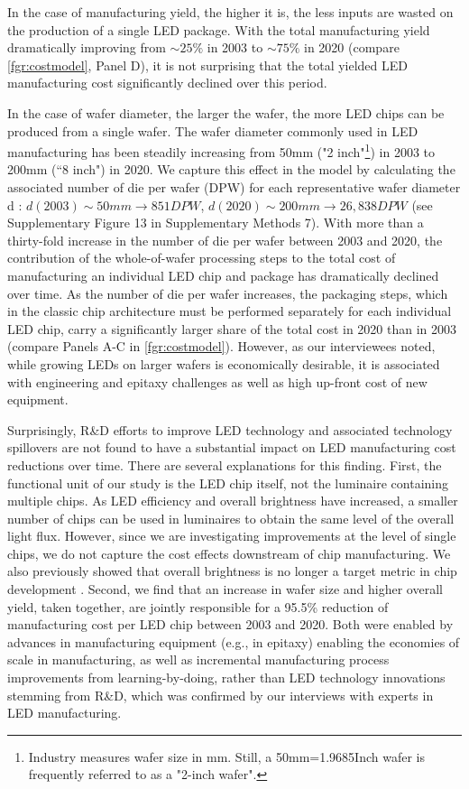 \documentclass[parskip=full]{article}
\begin{document}
In the case of manufacturing yield, the higher it is, the less inputs are wasted on the production of a single LED package. With the total manufacturing yield dramatically improving from $\sim25\%$ in 2003 to $\sim75\%$ in 2020 (compare \cref{fgr:costmodel}, Panel D), it is not surprising that the total yielded LED manufacturing cost significantly declined over this period.

In the case of wafer diameter, the larger the wafer, the more LED chips can be produced from a single wafer. The wafer diameter commonly used in LED manufacturing has been steadily increasing from 50mm ("2 inch"\footnote{Industry measures wafer size in mm. Still, a 50mm=1.9685Inch wafer is frequently referred to as a "2-inch wafer".}) in 2003 to 200mm (“8 inch") in 2020. We capture this effect in the model by calculating the associated number of die per wafer (DPW) for each representative wafer diameter d \cite{de2005investigation}: $d(2003)\sim 50 mm \rightarrow851 DPW$, $d(2020)\sim200 mm \rightarrow 26,838 DPW$ (see Supplementary Figure 13 in Supplementary Methods 7). With more than a thirty-fold increase in the number of die per wafer between 2003 and 2020, the contribution of the whole-of-wafer processing steps to the total cost of manufacturing an individual LED chip and package has dramatically declined over time. As the number of die per wafer increases, the packaging steps, which in the classic chip architecture must be performed separately for each individual LED chip, carry a significantly larger share of the total cost in 2020 than in 2003 (compare Panels A-C in \cref{fgr:costmodel}). However, as our interviewees noted, while growing LEDs on larger wafers is economically desirable, it is associated with engineering and epitaxy challenges as well as high up-front cost of new equipment.

Surprisingly, R\&D efforts to improve LED technology and associated technology spillovers are not found to have a substantial impact on LED manufacturing cost reductions over time. There are several explanations for this finding. First, the functional unit of our study is the LED chip itself, not the luminaire containing multiple chips. As LED efficiency and overall brightness have increased, a smaller number of chips can be used in luminaires to obtain the same level of the overall light flux. However, since we are investigating improvements at the level of single chips, we do not capture the cost effects downstream of chip manufacturing. We also previously showed that overall brightness is no longer a target metric in chip development \cite{weinold2021compound}. Second, we find that an increase in wafer size and higher overall yield, taken together, are jointly responsible for a 95.5\% reduction of manufacturing cost per LED chip between 2003 and 2020. Both were enabled by advances in manufacturing equipment (e.g., in epitaxy) enabling the economies of scale in manufacturing, as well as incremental manufacturing process improvements from learning-by-doing, rather than LED technology innovations stemming from R\&D, which was confirmed by our interviews with experts in LED manufacturing.
\end{document}

